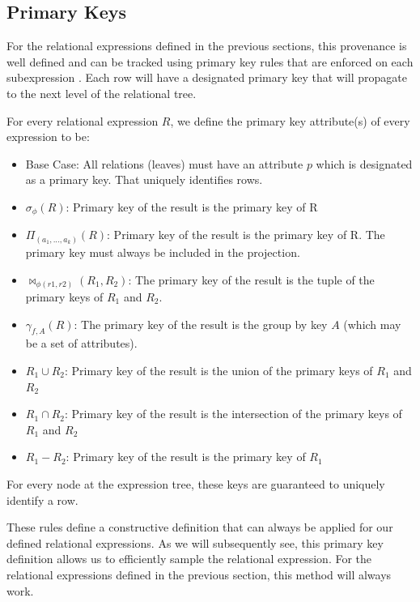 \subsection{Primary Keys}
For the relational expressions defined in the previous sections, this provenance is well defined and can be tracked using primary key rules that are enforced on
each subexpression \cite{DBLP:journals/vldb/CuiW03}. 
Each row will have a designated primary key that will propagate to the next level of the relational tree.
\begin{definition} \label{pk}
For every relational expression $R$, we define the primary key attribute(s) of every expression to be:
\begin{itemize}[noitemsep]
\item Base Case: All relations (leaves) must have an attribute $p$ which is designated as a primary key. That uniquely identifies rows.
\item $\sigma_{\phi}(R)$: Primary key of the result is the primary key of R 
\item $\Pi_{(a_1,...,a_k)}(R)$: Primary key of the result is the primary key of R. The primary key must always be included in the projection.
\item $\bowtie_{\phi (r1,r2)}(R_1,R_2)$: The primary key of the result is the tuple of the primary keys of $R_1$ and $R_2$. 
\item $\gamma_{f,A}(R)$: The primary key of the result is the group by key $A$ (which may be a set of attributes).
\item $R_1 \cup R_2$: Primary key of the result is the union of the primary keys of $R_1$ and $R_2$
\item $R_1 \cap R_2$: Primary key of the result is the intersection of the primary keys of $R_1$ and $R_2$
\item $R_1 - R_2$: Primary key of the result is the primary key of $R_1$
\end{itemize}
For every node at the expression tree, these keys are guaranteed to uniquely identify a row.
\end{definition}
These rules define a constructive definition that can always be applied for our defined relational expressions. 
As we will subsequently see, this primary key definition allows us to efficiently sample the relational expression.
For the relational expressions defined in the previous section, this method will always work. 

